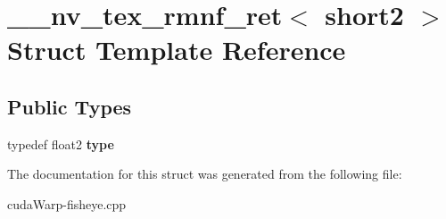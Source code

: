 \hypertarget{struct____nv__tex__rmnf__ret_3_01short2_01_4}{}\section{\+\_\+\+\_\+nv\+\_\+tex\+\_\+rmnf\+\_\+ret$<$ short2 $>$ Struct Template Reference}
\label{struct____nv__tex__rmnf__ret_3_01short2_01_4}
\subsection*{Public Types}
\begin{DoxyCompactItemize}
\item 
typedef float2 {\bfseries type}\hypertarget{struct____nv__tex__rmnf__ret_3_01short2_01_4_a97ad9021fd100d88656ecfd67b696ccd}{}\label{struct____nv__tex__rmnf__ret_3_01short2_01_4_a97ad9021fd100d88656ecfd67b696ccd}

\end{DoxyCompactItemize}


The documentation for this struct was generated from the following file\+:\begin{DoxyCompactItemize}
\item 
cuda\+Warp-\/fisheye.\+cpp\end{DoxyCompactItemize}
